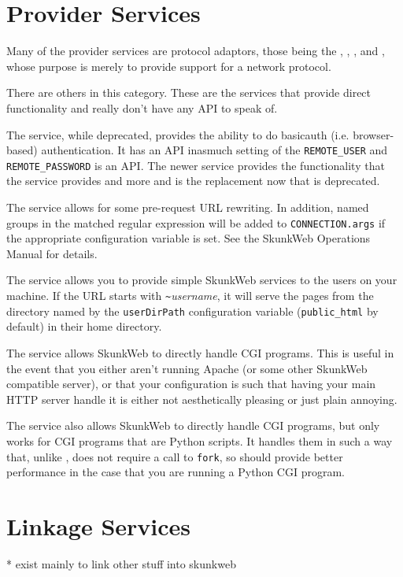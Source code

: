 \documentclass{manual}
\begin{document}
\section{Provider Services}
Many of the provider services are protocol adaptors, those being the
, , , 
and , whose purpose is merely to provide support for a
network protocol.

There are others in this category.  These are the services that
provide direct functionality and really don't have any API to speak of.

The  service, while deprecated, provides the
ability to do basicauth (i.e. browser-based) authentication.  It has
an API inasmuch setting of the
\texttt{REMOTE_USER} and
\texttt{REMOTE_PASSWORD} is an API.
The newer  service provides the functionality that the
 service provides and more and is the replacement
now that  is deprecated.

The  service allows for some pre-request URL
rewriting.  In addition, named groups in the matched regular
expression will be added to \texttt{CONNECTION.args} if the
appropriate configuration variable is set.  See the SkunkWeb
Operations Manual for details.

The  service allows you to provide simple SkunkWeb
services to the users on your machine.  If the URL starts with
\texttt{\~}\emph{username}, it will serve the pages from the directory
named by the \texttt{userDirPath} configuration variable
(\texttt{public_html} by default) in their home directory.

The  service allows SkunkWeb to directly handle CGI
programs.  This is useful in the event that you either aren't running
Apache (or some other SkunkWeb compatible server), or that your
configuration is such that having your main HTTP server handle it is
either not aesthetically pleasing or just plain annoying.

The  service also allows SkunkWeb to directly handle
CGI programs, but  only works for CGI programs that are
Python scripts.  It handles them in such a way that, unlike
, does not require a call to \texttt{fork}, so should
provide better performance in the case that you are running a Python
CGI program.

\section{Linkage Services}
       * exist mainly to link other stuff into skunkweb 
\end{document}
